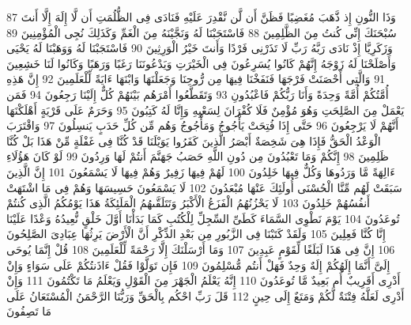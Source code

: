 \documentclass[20pt,a4paper]{article}
\begin{document}
{\tiny\colorbox{cl_aya}{87}} وَذَا النُّونِ إِذ ذَّهَبَ مُغَضِبًا فَظَنَّ أَن لَّن نَّقْدِرَ عَلَيْهِ فَنَادَى فِى الظُّلُمَتِ أَن لَّا إِلَهَ إِلَّا أَنتَ سُبْحَنَكَ إِنِّى كُنتُ مِنَ الظَّلِمِينَ
{\tiny\colorbox{cl_aya}{88}} فَاسْتَجَبْنَا لَهُ وَنَجَّيْنَهُ مِنَ الْغَمِّ وَكَذَلِكَ نُجِى الْمُؤْمِنِينَ
{\tiny\colorbox{cl_aya}{89}} وَزَكَرِيَّا إِذْ نَادَى رَبَّهُ رَبِّ لَا تَذَرْنِى فَرْدًا وَأَنتَ خَيْرُ الْوَرِثِينَ
{\tiny\colorbox{cl_aya}{90}} فَاسْتَجَبْنَا لَهُ وَوَهَبْنَا لَهُ يَحْيَى وَأَصْلَحْنَا لَهُ زَوْجَهُ إِنَّهُمْ كَانُوا يُسَرِعُونَ فِى الْخَيْرَتِ وَيَدْعُونَنَا رَغَبًا وَرَهَبًا وَكَانُوا لَنَا خَشِعِينَ
{\tiny\colorbox{cl_aya}{91}} وَالَّتِى أَحْصَنَتْ فَرْجَهَا فَنَفَخْنَا فِيهَا مِن رُّوحِنَا وَجَعَلْنَهَا وَابْنَهَا ءَايَةً لِّلْعَلَمِينَ
{\tiny\colorbox{cl_aya}{92}} إِنَّ هَذِهِ أُمَّتُكُمْ أُمَّةً وَحِدَةً وَأَنَا رَبُّكُمْ فَاعْبُدُونِ
{\tiny\colorbox{cl_aya}{93}} وَتَقَطَّعُوا أَمْرَهُم بَيْنَهُمْ كُلٌّ إِلَيْنَا رَجِعُونَ
{\tiny\colorbox{cl_aya}{94}} فَمَن يَعْمَلْ مِنَ الصَّلِحَتِ وَهُوَ مُؤْمِنٌ فَلَا كُفْرَانَ لِسَعْيِهِ وَإِنَّا لَهُ كَتِبُونَ
{\tiny\colorbox{cl_aya}{95}} وَحَرَمٌ عَلَى قَرْيَةٍ أَهْلَكْنَهَا أَنَّهُمْ لَا يَرْجِعُونَ
{\tiny\colorbox{cl_aya}{96}} حَتَّى إِذَا فُتِحَتْ يَأْجُوجُ وَمَأْجُوجُ وَهُم مِّن كُلِّ حَدَبٍ يَنسِلُونَ
{\tiny\colorbox{cl_aya}{97}} وَاقْتَرَبَ الْوَعْدُ الْحَقُّ فَإِذَا هِىَ شَخِصَةٌ أَبْصَرُ الَّذِينَ كَفَرُوا يَوَيْلَنَا قَدْ كُنَّا فِى غَفْلَةٍ مِّنْ هَذَا بَلْ كُنَّا ظَلِمِينَ
{\tiny\colorbox{cl_aya}{98}} إِنَّكُمْ وَمَا تَعْبُدُونَ مِن دُونِ اللَّهِ حَصَبُ جَهَنَّمَ أَنتُمْ لَهَا وَرِدُونَ
{\tiny\colorbox{cl_aya}{99}} لَوْ كَانَ هَؤُلَاءِ ءَالِهَةً مَّا وَرَدُوهَا وَكُلٌّ فِيهَا خَلِدُونَ
{\tiny\colorbox{cl_aya}{100}} لَهُمْ فِيهَا زَفِيرٌ وَهُمْ فِيهَا لَا يَسْمَعُونَ
{\tiny\colorbox{cl_aya}{101}} إِنَّ الَّذِينَ سَبَقَتْ لَهُم مِّنَّا الْحُسْنَى أُولَئِكَ عَنْهَا مُبْعَدُونَ
{\tiny\colorbox{cl_aya}{102}} لَا يَسْمَعُونَ حَسِيسَهَا وَهُمْ فِى مَا اشْتَهَتْ أَنفُسُهُمْ خَلِدُونَ
{\tiny\colorbox{cl_aya}{103}} لَا يَحْزُنُهُمُ الْفَزَعُ الْأَكْبَرُ وَتَتَلَقَّىهُمُ الْمَلَئِكَةُ هَذَا يَوْمُكُمُ الَّذِى كُنتُمْ تُوعَدُونَ
{\tiny\colorbox{cl_aya}{104}} يَوْمَ نَطْوِى السَّمَاءَ كَطَىِّ السِّجِلِّ لِلْكُتُبِ كَمَا بَدَأْنَا أَوَّلَ خَلْقٍ نُّعِيدُهُ وَعْدًا عَلَيْنَا إِنَّا كُنَّا فَعِلِينَ
{\tiny\colorbox{cl_aya}{105}} وَلَقَدْ كَتَبْنَا فِى الزَّبُورِ مِن بَعْدِ الذِّكْرِ أَنَّ الْأَرْضَ يَرِثُهَا عِبَادِىَ الصَّلِحُونَ
{\tiny\colorbox{cl_aya}{106}} إِنَّ فِى هَذَا لَبَلَغًا لِّقَوْمٍ عَبِدِينَ
{\tiny\colorbox{cl_aya}{107}} وَمَا أَرْسَلْنَكَ إِلَّا رَحْمَةً لِّلْعَلَمِينَ
{\tiny\colorbox{cl_aya}{108}} قُلْ إِنَّمَا يُوحَى إِلَىَّ أَنَّمَا إِلَهُكُمْ إِلَهٌ وَحِدٌ فَهَلْ أَنتُم مُّسْلِمُونَ
{\tiny\colorbox{cl_aya}{109}} فَإِن تَوَلَّوْا فَقُلْ ءَاذَنتُكُمْ عَلَى سَوَاءٍ وَإِنْ أَدْرِى أَقَرِيبٌ أَم بَعِيدٌ مَّا تُوعَدُونَ
{\tiny\colorbox{cl_aya}{110}} إِنَّهُ يَعْلَمُ الْجَهْرَ مِنَ الْقَوْلِ وَيَعْلَمُ مَا تَكْتُمُونَ
{\tiny\colorbox{cl_aya}{111}} وَإِنْ أَدْرِى لَعَلَّهُ فِتْنَةٌ لَّكُمْ وَمَتَعٌ إِلَى حِينٍ
{\tiny\colorbox{cl_aya}{112}} قَلَ رَبِّ احْكُم بِالْحَقِّ وَرَبُّنَا الرَّحْمَنُ الْمُسْتَعَانُ عَلَى مَا تَصِفُونَ
\end{document}
